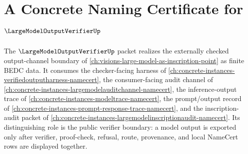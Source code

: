 \chapter{A Concrete Naming Certificate for $\LargeModelOutputVerifierUp$}
\label{ch:concrete-instances-largemodeloutputverifier-namecert}

The $\LargeModelOutputVerifierUp$ packet realizes the externally checked output-channel boundary of \autoref{ch:visions-large-model-as-inscription-point} as finite BEDC data. It consumes the checker-facing harness of \autoref{ch:concrete-instances-verifiedoutputharness-namecert}, the consumer-facing audit channel of \autoref{ch:concrete-instances-largemodelauditchannel-namecert}, the inference-output trace of \autoref{ch:concrete-instances-modeltrace-namecert}, the prompt/output record of \autoref{ch:concrete-instances-prompt-response-trace-namecert}, and the inscription-audit packet of \autoref{ch:concrete-instances-largemodelinscriptionaudit-namecert}. Its distinguishing role is the public verifier boundary: a model output is exported only after verifier, proof-check, refusal, route, provenance, and local NameCert rows are displayed together.

